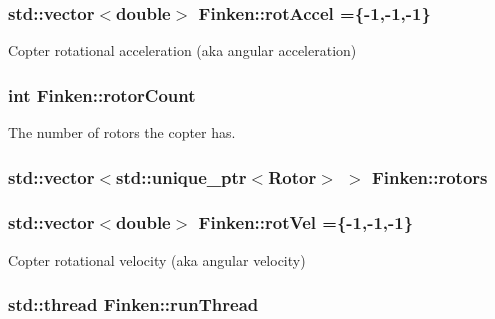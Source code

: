 \subsubsection[{\texorpdfstring{rot\+Accel}{rotAccel}}]{\setlength{\rightskip}{0pt plus 5cm}std\+::vector$<$double$>$ Finken\+::rot\+Accel =\{-\/1,-\/1,-\/1\}}\hypertarget{classFinken_ab1b738a1b691879be240b1b9488f7009}{}\label{classFinken_ab1b738a1b691879be240b1b9488f7009}


Copter rotational acceleration (aka angular acceleration) 

\subsubsection[{\texorpdfstring{rotor\+Count}{rotorCount}}]{\setlength{\rightskip}{0pt plus 5cm}int Finken\+::rotor\+Count}\hypertarget{classFinken_a41d179b5343816aad624ae5d567892a0}{}\label{classFinken_a41d179b5343816aad624ae5d567892a0}


The number of rotors the copter has. 

\subsubsection[{\texorpdfstring{rotors}{rotors}}]{\setlength{\rightskip}{0pt plus 5cm}std\+::vector$<$std\+::unique\+\_\+ptr$<${\bf Rotor}$>$ $>$ Finken\+::rotors\hspace{0.3cm}{\ttfamily [private]}}\hypertarget{classFinken_a96eb08e472539845391c0c0a95260fd7}{}\label{classFinken_a96eb08e472539845391c0c0a95260fd7}
\subsubsection[{\texorpdfstring{rot\+Vel}{rotVel}}]{\setlength{\rightskip}{0pt plus 5cm}std\+::vector$<$double$>$ Finken\+::rot\+Vel =\{-\/1,-\/1,-\/1\}}\hypertarget{classFinken_a518ab8ab8ac8cf54c0b79cbc1ec2075f}{}\label{classFinken_a518ab8ab8ac8cf54c0b79cbc1ec2075f}


Copter rotational velocity (aka angular velocity) 

\subsubsection[{\texorpdfstring{run\+Thread}{runThread}}]{\setlength{\rightskip}{0pt plus 5cm}std\+::thread Finken\+::run\+Thread}\hypertarget{classFinken_a490f025c596b5c87d1c583124b53e34b}{}\label{classFinken_a490f025c596b5c87d1c583124b53e34b}


